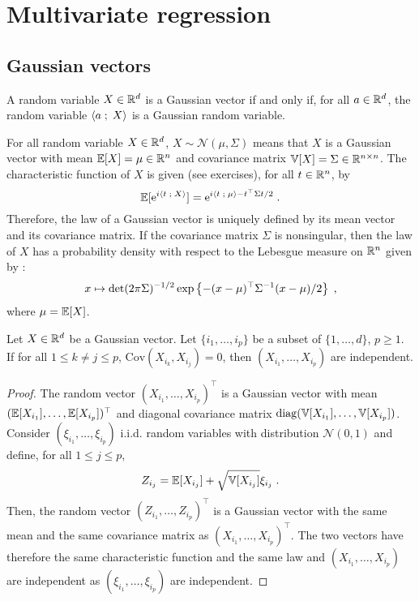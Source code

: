 \chapter{Multivariate regression}
\minitoc
\begin{kwd}

\end{kwd}

\section{Gaussian vectors}

\begin{shaded}
\begin{definition}
\label{def:gauss:vec}
A random variable $X\in\mathbb{R}^d$ is a Gaussian vector if and only if, for all $a\in\mathbb{R}^d$, the random variable $\langle a\;;\; X\rangle$ is a Gaussian random variable.
\end{definition}
\end{shaded}
For all random variable $X\in\mathbb{R}^d$,  $X\sim \mathcal{N}(\mu,\Sigma)$ means that $X$ is a Gaussian vector with mean $\mathbb{E}[X] = \mu\in\mathbb{R}^n$ and covariance matrix $\mathbb{V}[X] = \Sigma\in\mathbb{R}^{n\times n}$. The characteristic function of $X$ is given (see exercises), for all $t\in\mathbb{R}^n$, by
\[
\mathbb{E}[\mathrm{e}^{i\langle t\;;\; X\rangle}] = \mathrm{e}^{i\langle t\;;\; \mu\rangle - t^\top\Sigma t /2}\;.
\]
Therefore, the law of a Gaussian vector is uniquely defined by its mean vector and its covariance matrix.
If the covariance matrix $\Sigma$ is nonsingular, then the law of $X$ has a probability density with respect to the Lebesgue measure on $\mathbb{R}^n$ given by : 
\[
x\mapsto \mathrm{det}(2\pi \Sigma)^{-1/2} \exp\left\{-(x-\mu)^\top\Sigma^{-1}(x-\mu)/2\right\}\;,
\]
where $\mu = \mathbb{E}[X]$.

\begin{shaded}
\begin{proposition}
\label{prop:gauss:vec:decor}
Let $X\in\mathbb{R}^d$ be a Gaussian vector. Let $\{i_1,\ldots,i_p\}$ be a subset of $\{1,\ldots,d\}$, $p\geqslant 1$. If for all $1\leqslant k\neq j \leqslant p$, $\mathrm{Cov}(X_{i_k},X_{i_j}) = 0$, then $(X_{i_1},\ldots,X_{i_p})$ are independent.
\end{proposition}
\end{shaded}
\begin{proof}
The random vector $(X_{i_1},\ldots,X_{i_p})^\top$ is a Gaussian vector with mean $(\mathbb{E}[X_{i_1}],\ldots,\mathbb{E}[X_{i_p}])^\top$ and diagonal covariance matrix $\mathrm{diag}(\mathbb{V}[X_{i_1}],\ldots,\mathbb{V}[X_{i_p}])$. Consider $(\xi_{i_1},\ldots,\xi_{i_p})$ i.i.d. random variables with distribution $\mathcal{N}(0,1)$ and define, for all $1\leqslant j \leqslant p$,
\[
Z_{i_j} = \mathbb{E}[X_{i_j}]  + \sqrt{\mathbb{V}[X_{i_j}]}\xi_{i_j}\;.
\]
Then, the random vector $(Z_{i_1},\ldots,Z_{i_p})^\top$ is a Gaussian vector with the same mean and the same covariance matrix as $(X_{i_1},\ldots,X_{i_p})^\top$. The two vectors have therefore the same characteristic function and the same law and $(X_{i_1},\ldots,X_{i_p})$  are independent as  $(\xi_{i_1},\ldots,\xi_{i_p})$ are independent.
\end{proof}

